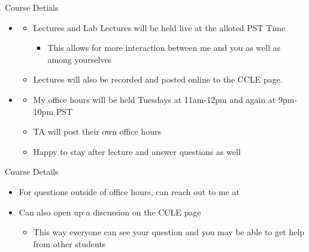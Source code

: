 \documentclass[notheorems,9pt]{beamer}
\begin{document}
\begin{frame}{Course Detials} 
	\begin{itemize}
		\item {}
		\begin{itemize}
			\item Lectures and Lab Lectures will be held live at the alloted PST Time
			\begin{itemize}
				\item This allows for more interaction between me and you as well as among yourselves
			\end{itemize}
			\item Lectures will also be recorded and posted online to the CCLE page.
		\end{itemize}
	\item {}
	\begin{itemize}
		\item My office hours will be held Tuesdays at 11am-12pm and again at 9pm-10pm PST
		\item TA will post their own office hours
		\item Happy to stay after lecture and answer questions as well
	\end{itemize}
	\end{itemize}
\end{frame}

\begin{frame}[t]{Course Details} 
	\begin{itemize}
		\item For questions outside of office hours, can reach out to me at 
		\item Can also open up a discussion on the CCLE page 
		\begin{itemize}
			\item This way everyone can see your question and you may be able to get help from other students
		\end{itemize}
	\end{itemize}
\end{frame}
\end{document}
